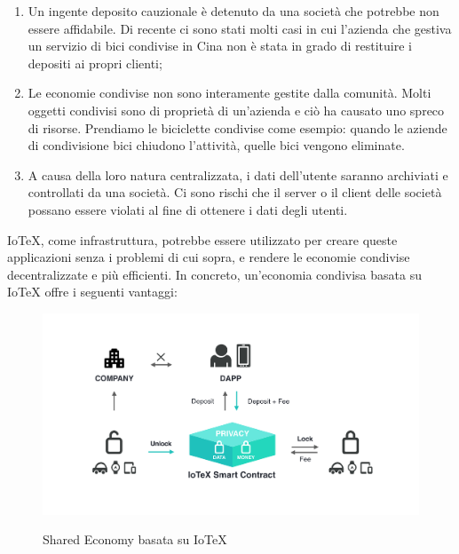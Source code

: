 \begin{enumerate}
    \item Un ingente deposito cauzionale è detenuto da una società che potrebbe non essere affidabile. Di recente ci sono stati molti casi in cui l'azienda che gestiva un servizio di bici condivise in Cina non è stata in grado di restituire i depositi ai propri clienti;

    \item Le economie condivise non sono interamente gestite dalla comunità. Molti oggetti condivisi sono di proprietà di un'azienda e ciò ha causato uno spreco di risorse. Prendiamo le biciclette condivise come esempio: quando le aziende di condivisione bici chiudono l'attività, quelle bici vengono eliminate.

    \item A causa della loro natura centralizzata, i dati dell'utente saranno archiviati e controllati da una società. Ci sono rischi che il server o il client delle società possano essere violati al fine di ottenere i dati degli utenti.
\end{enumerate}

IoTeX, come infrastruttura, potrebbe essere utilizzato per creare queste applicazioni senza i problemi di cui sopra, e rendere le economie condivise decentralizzate e più efficienti. In concreto, un'economia condivisa basata su IoTeX offre i seguenti vantaggi:

\begin{figure}[ht]
    \centering
    \includegraphics[width=\textwidth]{Figura7}
    \label{fig:Figura7}
    \caption{Shared Economy basata su IoTeX}
\end{figure}

